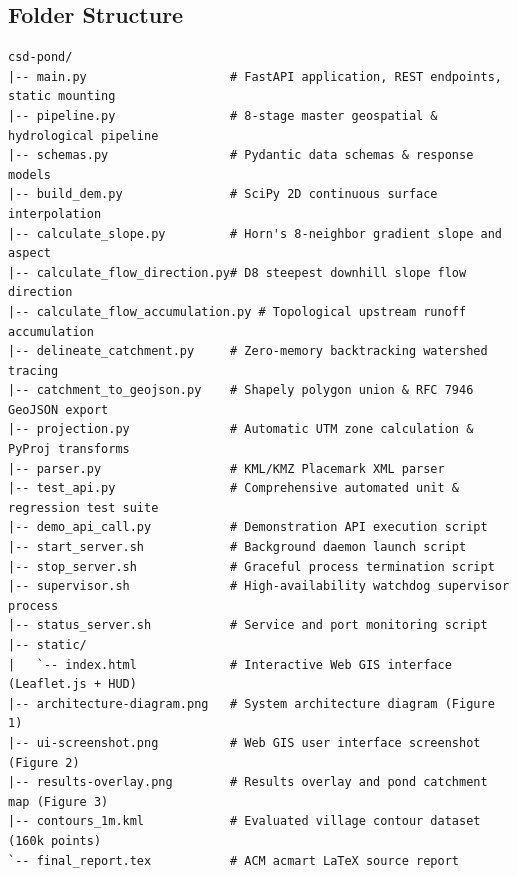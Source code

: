 \documentclass[manuscript,screen,review]{acmart}
\begin{document}
\subsection{Folder Structure}
\begin{verbatim}
csd-pond/
|-- main.py                    # FastAPI application, REST endpoints, static mounting
|-- pipeline.py                # 8-stage master geospatial & hydrological pipeline
|-- schemas.py                 # Pydantic data schemas & response models
|-- build_dem.py               # SciPy 2D continuous surface interpolation
|-- calculate_slope.py         # Horn's 8-neighbor gradient slope and aspect
|-- calculate_flow_direction.py# D8 steepest downhill slope flow direction
|-- calculate_flow_accumulation.py # Topological upstream runoff accumulation
|-- delineate_catchment.py     # Zero-memory backtracking watershed tracing
|-- catchment_to_geojson.py    # Shapely polygon union & RFC 7946 GeoJSON export
|-- projection.py              # Automatic UTM zone calculation & PyProj transforms
|-- parser.py                  # KML/KMZ Placemark XML parser
|-- test_api.py                # Comprehensive automated unit & regression test suite
|-- demo_api_call.py           # Demonstration API execution script
|-- start_server.sh            # Background daemon launch script
|-- stop_server.sh             # Graceful process termination script
|-- supervisor.sh              # High-availability watchdog supervisor process
|-- status_server.sh           # Service and port monitoring script
|-- static/
|   `-- index.html             # Interactive Web GIS interface (Leaflet.js + HUD)
|-- architecture-diagram.png   # System architecture diagram (Figure 1)
|-- ui-screenshot.png          # Web GIS user interface screenshot (Figure 2)
|-- results-overlay.png        # Results overlay and pond catchment map (Figure 3)
|-- contours_1m.kml            # Evaluated village contour dataset (160k points)
`-- final_report.tex           # ACM acmart LaTeX source report
\end{verbatim}
\end{document}
